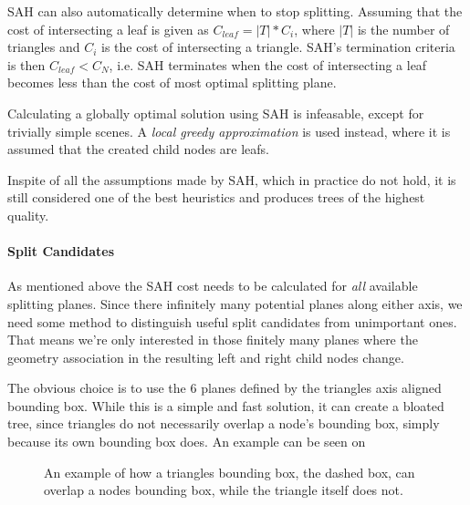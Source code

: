 SAH can also automatically determine when to stop splitting. Assuming
that the cost of intersecting a leaf is given as $C_{leaf} = |T| *
C_i$, where $|T|$ is the number of triangles and $C_i$ is the cost of
intersecting a triangle. SAH's termination criteria is then $C_{leaf}
< C_N$, i.e. SAH terminates when the cost of intersecting a leaf
becomes less than the cost of most optimal splitting plane.


Calculating a globally optimal solution using SAH is infeasable,
except for trivially simple scenes. A \textit{local greedy
  approximation} is used instead, where it is assumed that the created
child nodes are leafs.

Inspite of all the assumptions made by SAH, which in practice do not
hold, it is still considered one of the best heuristics and produces
trees of the highest quality.



\paragraph{Split Candidates}


As mentioned above the SAH cost needs to be calculated for
\textit{all} available splitting planes. Since there infinitely many
potential planes along either axis, we need some method to distinguish
useful split candidates from unimportant ones. That means we're only
interested in those finitely many planes where the geometry
association in the resulting left and right child nodes change.


The obvious choice is to use the 6 planes defined by the triangles
axis aligned bounding box. While this is a simple and fast solution,
it can create a bloated tree, since triangles do not necessarily
overlap a node's bounding box, simply because its own bounding box
does. An example can be seen on 

\begin{figure}
  \centering

  \vspace{3mm}
  \parbox{5cm}{\caption[Triangle/Node bounding box intersection.]{An
      example of how a triangles bounding box, the dashed box, can
      overlap a nodes bounding box, while the triangle itself does
      not.}\label{fig:aabbSplit}}
\end{figure}

